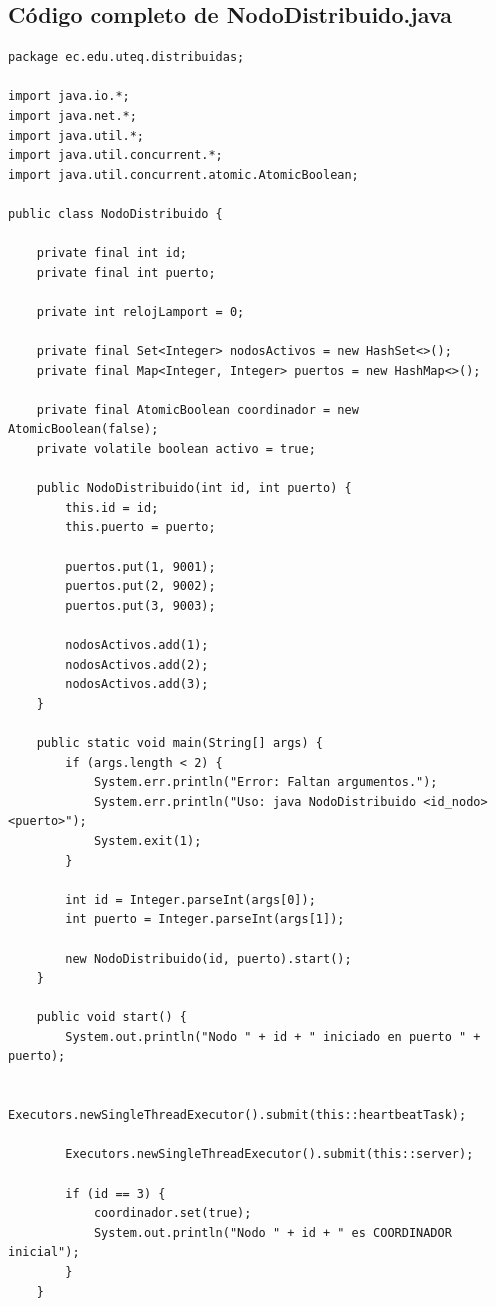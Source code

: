 \documentclass[12pt,a4paper]{article}
\begin{document}
\subsection{Código completo de NodoDistribuido.java}

\begin{lstlisting}[caption={Código completo de NodoDistribuido.java}]
package ec.edu.uteq.distribuidas;

import java.io.*;
import java.net.*;
import java.util.*;
import java.util.concurrent.*;
import java.util.concurrent.atomic.AtomicBoolean;

public class NodoDistribuido {

    private final int id;
    private final int puerto;

    private int relojLamport = 0;

    private final Set<Integer> nodosActivos = new HashSet<>();
    private final Map<Integer, Integer> puertos = new HashMap<>();

    private final AtomicBoolean coordinador = new AtomicBoolean(false);
    private volatile boolean activo = true;

    public NodoDistribuido(int id, int puerto) {
        this.id = id;
        this.puerto = puerto;

        puertos.put(1, 9001);
        puertos.put(2, 9002);
        puertos.put(3, 9003);

        nodosActivos.add(1);
        nodosActivos.add(2);
        nodosActivos.add(3);
    }

    public static void main(String[] args) {
        if (args.length < 2) {
            System.err.println("Error: Faltan argumentos.");
            System.err.println("Uso: java NodoDistribuido <id_nodo> <puerto>");
            System.exit(1);
        }

        int id = Integer.parseInt(args[0]);
        int puerto = Integer.parseInt(args[1]);

        new NodoDistribuido(id, puerto).start();
    }

    public void start() {
        System.out.println("Nodo " + id + " iniciado en puerto " + puerto);

        Executors.newSingleThreadExecutor().submit(this::heartbeatTask);

        Executors.newSingleThreadExecutor().submit(this::server);

        if (id == 3) {
            coordinador.set(true);
            System.out.println("Nodo " + id + " es COORDINADOR inicial");
        }
    }


\end{lstlisting}
\end{document}

